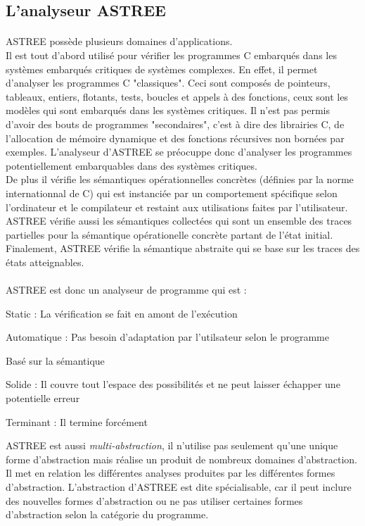\documentclass[french]{report}
\begin{document}
\subsection{L'analyseur ASTREE}

\paragraph{}
ASTREE possède plusieurs domaines d'applications. \\
Il est tout d'abord utilisé pour vérifier les programmes C embarqués dans les systèmes embarqués critiques
de systèmes complexes. En effet, il permet d'analyser les programmes C "classiques". Ceci sont composés de pointeurs,
tableaux, entiers, flotants, tests, boucles et appels à des fonctions, ceux sont les modèles qui sont embarqués dans les
systèmes critiques. Il n'est pas permis d'avoir des bouts de programmes "secondaires", c'est à dire des librairies C,
de l'allocation de mémoire dynamique et des fonctions récursives non bornées par exemples. L'analyseur d'ASTREE se
préocuppe donc d'analyser les programmes potentiellement embarquables dans des systèmes critiques. \\
De plus il vérifie les sémantiques opérationnelles concrètes (définies par la norme internationnal de C) qui
est instanciée par un comportement spécifique selon l'ordinateur et le compilateur et restaint aux utilisations faites par
l'utilisateur.
ASTREE vérifie aussi les sémantiques collectées qui sont un ensemble des traces partielles pour
la sémantique opérationelle concrète partant de l'état initial. Finalement, ASTREE vérifie la sémantique abstraite
qui se base sur les traces des états atteignables.

\paragraph{}
ASTREE est donc un analyseur de programme qui est :
\begin{description}
    \item Static : La vérification se fait en amont de l'exécution
    \item Automatique : Pas besoin d'adaptation par l'utilsateur selon le programme
    \item Basé sur la sémantique
    \item Solide : Il couvre tout l'espace des possibilités et ne peut laisser échapper une potentielle erreur
    \item Terminant : Il termine forcément
\end{description}
ASTREE est aussi \textit{multi-abstraction}, il n'utilise pas seulement qu'une unique forme d'abstraction mais réalise
un produit de nombreux domaines d'abstraction. Il met en relation les différentes analyses produites par les différentes
formes d'abstraction. L'abstraction d'ASTREE est dite spécialisable, car il peut inclure des nouvelles
formes d'abstraction ou ne pas utiliser certaines formes d'abstraction selon la catégorie du programme.
\end{document}

